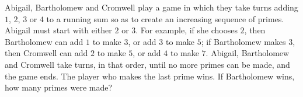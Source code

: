 Abigail, Bartholomew and Cromwell play a game in which they take turns adding $1$, $2$, $3$ or $4$ to a running sum so as to create an increasing sequence of primes. Abigail must start with either $2$ or $3$. For example, if she chooses $2$, then Bartholomew can add $1$ to make $3$, or add $3$ to make $5$; if Bartholomew makes $3$, then Cromwell can add $2$ to make $5$, or add $4$ to make $7$. Abigail, Bartholomew and Cromwell take turns, in that order, until no more primes can be made, and the game ends. The player who makes the last prime wins. If Bartholomew wins, how many primes were made?
